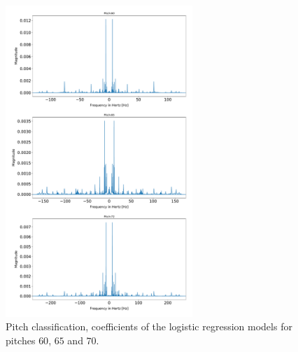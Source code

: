 \documentclass[12pt,twoside]{article}
\begin{document}
\begin{enumerate}
\begin{enumerate}
\begin{enumerate}
	\begin{figure}[H]
		\centering
		\captionsetup{justification=centering}
		\includegraphics[width=200pt]{code/musicdata/pitch_classification.pdf}
		\caption{Pitch classification, coefficients of the logistic regression models for pitches $60$, $65$ and $70$.}
	\end{figure}

      
    \end{enumerate}
  \end{enumerate}

 \end{enumerate}
\end{document}
